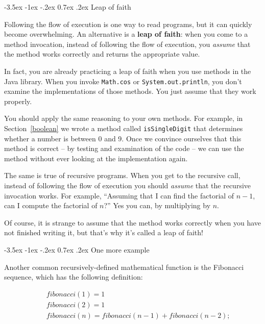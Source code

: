 \documentclass[12pt]{book}
\makeatletter
\theoremstyle{exercise}
\newcommand{\java}[1]{\verb"#1"}
\renewcommand{\section}{\@startsection{section}{1}{\z@}%
    {-3.5ex \@plus -1ex \@minus -.2ex}%
    {0.7ex \@plus.2ex}%
    {\normalfont\Large\bfseries}}
\newcommand{\java}[1]{\lstinline{#1}} %
\makeatother
\begin{document}
\section{Leap of faith}
\label{leap of faith}


Following the flow of execution is one way to read programs, but it can quickly become overwhelming.
An alternative is a {\bf leap of faith}:
when you come to a method invocation, instead of following the flow of execution, you {\em assume} that the method works correctly and returns the appropriate value.

In fact, you are already practicing a leap of faith when you use methods in the Java library.
When you invoke \java{Math.cos} or \java{System.out.println}, you don't examine the implementations of those methods.
You just assume that they work properly.

You should apply the same reasoning to your own methods.
For example, in Section~\ref{boolean} we wrote a method called \java{isSingleDigit} that determines whether a number is between 0 and 9.
Once we convince ourselves that this method is correct -- by testing and examination of the code -- we can use the method without ever looking at the implementation again.

The same is true of recursive programs.
When you get to the recursive call, instead of following the flow of execution you should {\em assume} that the recursive invocation works.
For example, ``Assuming that I can find the factorial of $n-1$, can I compute the factorial of $n$?''
Yes you can, by multiplying by $n$.

Of course, it is strange to assume that the method works correctly when you have not finished writing it, but that's why it's called a leap of faith!


\section{One more example}
\label{fibonacci}


Another common recursively-defined mathematical function is the Fibonacci sequence, which has the following definition:

\vspace{-1ex}
\begin{eqnarray*}
&& fibonacci(1) = 1 \\
&& fibonacci(2) = 1 \\
&& fibonacci(n) = fibonacci(n-1) + fibonacci(n-2);
\end{eqnarray*}
\vspace{-1ex}
\end{document}
